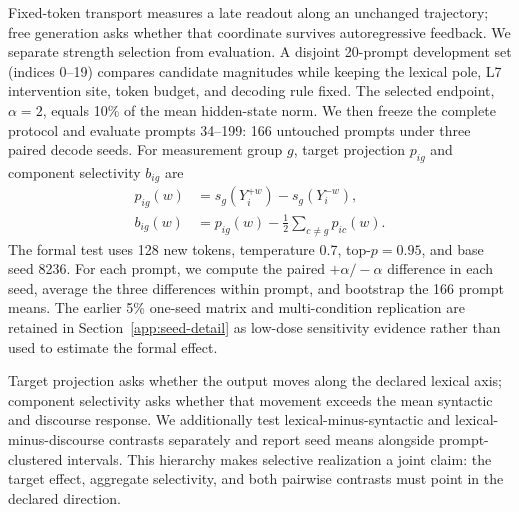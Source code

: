 Fixed-token transport measures a late readout along an unchanged trajectory; free generation asks whether that coordinate survives autoregressive feedback. We separate strength selection from evaluation. A disjoint 20-prompt development set (indices 0--19) compares candidate magnitudes while keeping the lexical pole, L7 intervention site, token budget, and decoding rule fixed. The selected endpoint, \(\alpha=2\), equals 10\% of the mean hidden-state norm. We then freeze the complete protocol and evaluate prompts 34--199: 166 untouched prompts under three paired decode seeds. For measurement group \(g\), target projection \(p_{ig}\) and component selectivity \(b_{ig}\) are
\begin{equation}
\begin{aligned}
p_{ig}(w)&=s_g(Y_i^{+w})-s_g(Y_i^{-w}),\\
b_{ig}(w)&=p_{ig}(w)-\frac{1}{2}\sum_{c\neq g}p_{ic}(w).
\end{aligned}
\label{eq:selectivity}
\end{equation}
The formal test uses 128 new tokens, temperature 0.7, top-\(p=0.95\), and base seed 8236. For each prompt, we compute the paired \(+\alpha/-\alpha\) difference in each seed, average the three differences within prompt, and bootstrap the 166 prompt means. The earlier 5\% one-seed matrix and multi-condition replication are retained in Section~\ref{app:seed-detail} as low-dose sensitivity evidence rather than used to estimate the formal effect.

Target projection asks whether the output moves along the declared lexical axis; component selectivity asks whether that movement exceeds the mean syntactic and discourse response. We additionally test lexical-minus-syntactic and lexical-minus-discourse contrasts separately and report seed means alongside prompt-clustered intervals. This hierarchy makes selective realization a joint claim: the target effect, aggregate selectivity, and both pairwise contrasts must point in the declared direction.

